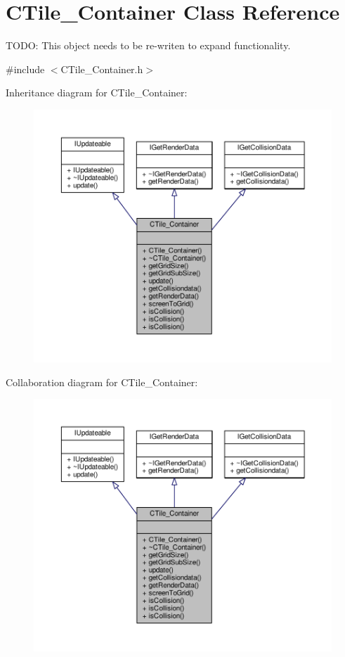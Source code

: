 \hypertarget{classCTile__Container}{\section{C\-Tile\-\_\-\-Container Class Reference}
\label{classCTile__Container}
}


T\-O\-D\-O\-: This object needs to be re-\/writen to expand functionality.  




{\ttfamily \#include $<$C\-Tile\-\_\-\-Container.\-h$>$}



Inheritance diagram for C\-Tile\-\_\-\-Container\-:\nopagebreak
\begin{figure}[H]
\begin{center}
\leavevmode
\includegraphics[width=350pt]{classCTile__Container__inherit__graph}
\end{center}
\end{figure}


Collaboration diagram for C\-Tile\-\_\-\-Container\-:\nopagebreak
\begin{figure}[H]
\begin{center}
\leavevmode
\includegraphics[width=350pt]{classCTile__Container__coll__graph}
\end{center}
\end{figure}

